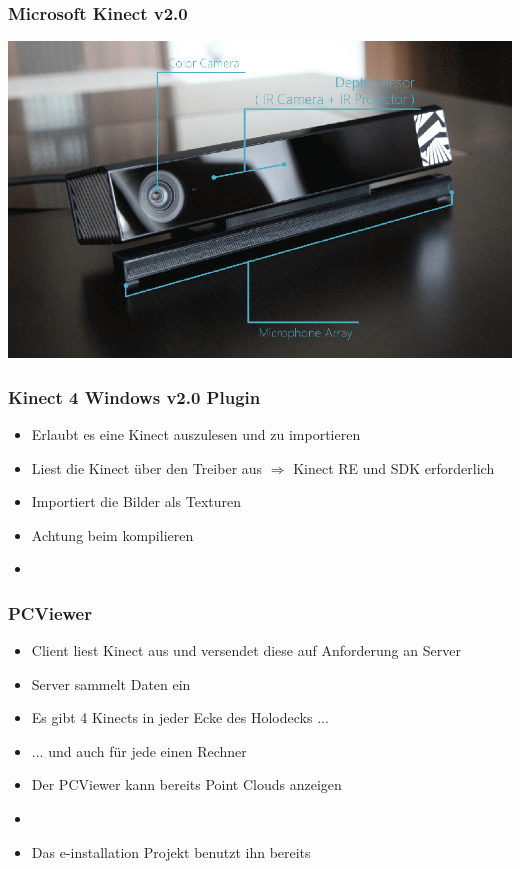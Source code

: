 \documentclass[18pt]{beamer}
\begin{document}
\begin{frame}
	\frametitle{Microsoft Kinect v2.0} 
	\includegraphics[width=0.7\paperwidth]{img/Kinectv2}
\end{frame}

\begin{frame}
	\frametitle{Kinect 4 Windows v2.0 Plugin} 
	\begin{itemize}
		\item Erlaubt es eine Kinect auszulesen und zu importieren
		\item Liest die Kinect über den Treiber aus $\Rightarrow$ Kinect RE und SDK erforderlich
		\item Importiert die Bilder als Texturen
		\item Achtung beim kompilieren
		\item {}
	\end{itemize}

\end{frame}

\begin{frame}
	\frametitle{PCViewer} 
	\begin{itemize}
		\item Client liest Kinect aus und versendet diese auf Anforderung an Server
		\item Server sammelt Daten ein
		\item Es gibt 4 Kinects in jeder Ecke des Holodecks ...
		\pause
		\item ... und auch für jede einen Rechner
		\item Der PCViewer kann bereits Point Clouds anzeigen
		\item {}
		\pause
		\item Das e-installation Projekt benutzt ihn bereits
	\end{itemize}
\end{frame}
\end{document}
